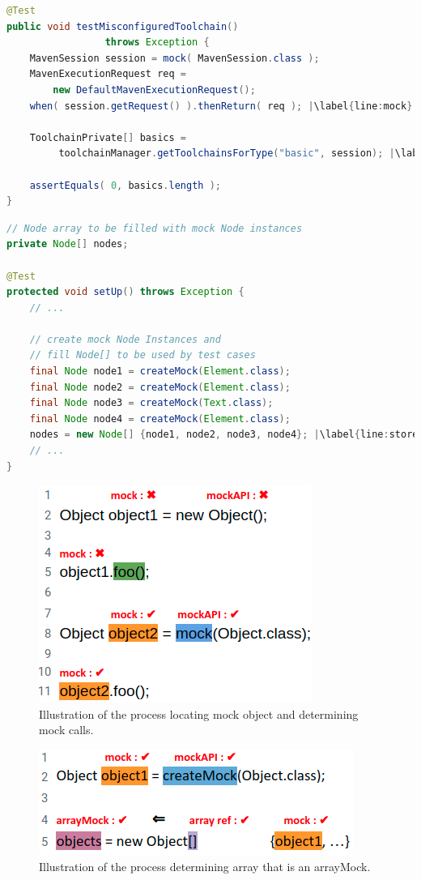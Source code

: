 \begin{lstlisting}[basicstyle=\ttfamily, caption={This code snippet illustrates an example from maven-core, where both the focal method \texttt{getToolchainsForType} and a method invocation \texttt{getRequest} on a mock object occur in test \textit{testMisconfiguredToolchain()}},
basicstyle=\scriptsize\ttfamily,language = Java, framesep=4.5mm, escapechar=|,
framexleftmargin=1.0mm, captionpos=b, xleftmargin=3.5ex, label=lis:mockCall]
@Test
public void testMisconfiguredToolchain()
                 throws Exception {
    MavenSession session = mock( MavenSession.class );
    MavenExecutionRequest req = 
        new DefaultMavenExecutionRequest();
    when( session.getRequest() ).thenReturn( req ); |\label{line:mock}|
    
    ToolchainPrivate[] basics =
         toolchainManager.getToolchainsForType("basic", session); |\label{line:real}|
    
    assertEquals( 0, basics.length );
}
\end{lstlisting}

\begin{lstlisting}[basicstyle=\ttfamily, caption={This example illustrates a field array container holding mock objects from \textit{setup()} in \texttt{NodeListIteratorTest.java}.},
basicstyle=\scriptsize\ttfamily,language = Java, framesep=4.5mm, framexleftmargin=1.0mm, captionpos=b, xleftmargin=3.5ex, label=lis:container, escapechar=|]
// Node array to be filled with mock Node instances
private Node[] nodes;

@Test
protected void setUp() throws Exception {
    // ...

    // create mock Node Instances and 
    // fill Node[] to be used by test cases
    final Node node1 = createMock(Element.class);
    final Node node2 = createMock(Element.class);
    final Node node3 = createMock(Text.class);
    final Node node4 = createMock(Element.class);
    nodes = new Node[] {node1, node2, node3, node4}; |\label{line:storeMocksInArray}|
    // ...
}
\end{lstlisting}


\begin{figure}
    \includegraphics[width=.25\textwidth]{Images/mockInvocationIllustration.png}
    
    \caption{Illustration of the process locating mock object and determining mock calls.}
    \label{fig:mockInvocationIllustration}
    
\end{figure}

\begin{figure}
    \includegraphics[width=.25\textwidth]{Images/arrayMockIllustration.png}
    
    \caption{Illustration of the process determining array that is an arrayMock.}
    \label{fig:arrayMockIllustration}
    
\end{figure}
